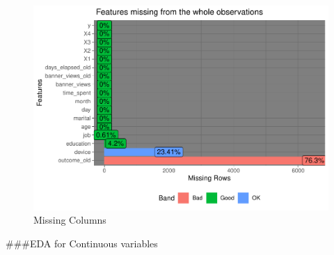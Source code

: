 \documentclass[
]{article}
\begin{document}
\begin{figure}

{\centering \includegraphics[width=0.75\linewidth]{report_files/figure-latex/Missing variables-1} 

}

\caption{Missing Columns}\label{fig:Missing variables}
\end{figure}

\#\#\#EDA for Continuous variables
\end{document}
